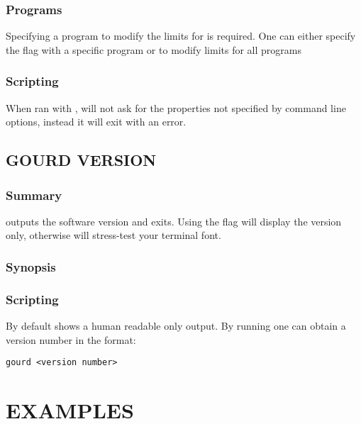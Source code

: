 \documentclass[a4paper,english]{article}
\begin{document}
\begin{adjustwidth}{18pt}{0pt}
            \subsubsection{Programs}
                Specifying a program to modify the limits for is required.
                One can either specify the  flag with a specific program
                or  to modify limits for all programs

            \subsubsection{Scripting}
                When ran with ,  will not ask for the properties
                not specified by command line options, instead it will exit with an error.

        \subsection{GOURD VERSION}

            \subsubsection{Summary}
                  outputs the software version and exits.
                Using the  flag will display the version only, otherwise 
                will stress-test your terminal font.

            \subsubsection{Synopsis}
                  

            \subsubsection{Scripting}
                By default   shows a human readable only output. By
                running    one can obtain a version number
                in the format:

                \texttt{gourd <version number>}

    \section{EXAMPLES}


\end{adjustwidth}
\end{document}
